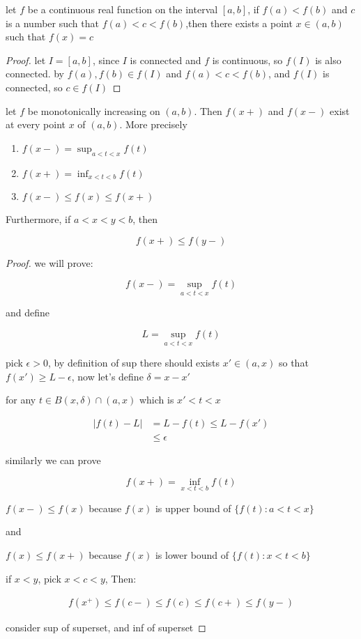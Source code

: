 \begin{corollary}
    let $f$ be a continuous real function on the interval $[a,b]$, if $f(a) < f(b)$ and $c$
    is a number such that $f(a) < c < f(b)$,then there exists a point $x \in (a,b)$ such that 
    $f(x) = c$
\end{corollary}

\begin{proof}
    let $I = [a,b]$, since $I$ is connected and $f$ is continuous, so $f(I)$ is also connected.
    by $f(a), f(b) \in f(I)$ and $f(a) < c < f(b)$, and $f(I)$ is connected, 
    so $c \in f(I)$
\end{proof}

\begin{thm}
    let $f$ be monotonically increasing on $(a,b)$. Then $f(x+)$ and $f(x-)$ 
    exist at every point $x $ of $(a,b)$. More precisely

    \begin{enumerate}
        \item $f(x-) = \sup_{a < t <x}f(t)$
        \item $f(x+) = \inf_{x < t <b}f(t)$
        \item $f(x-) \le f(x) \le f(x+)$
    \end{enumerate}

    Furthermore, if $a < x < y < b$, then

    \[
        f(x+) \le f(y-)
    \]
\end{thm}

\begin{proof}
    we will prove:

    \[
        f(x-) = \sup_{a < t <x}f(t)
    \]

    and define

    \[
        L = \sup_{a < t <x}f(t)
    \]

    
    pick $\epsilon > 0$, by definition of sup there should 
    exists $x' \in (a,x)$ so that $f(x') \ge L - \epsilon$, now let's define $\delta = x -x'$

    for any $t \in B(x, \delta) \cap (a,x)$ which is $x' < t < x$

    \begin{align*}
        \left| f(t) - L \right| &= L - f(t) \le L - f(x') \\
        & \le \epsilon
    \end{align*}

    similarly we can prove 


    \[
        f(x+) = \inf_{x < t <b}f(t)
    \]

    $f(x-) \le f(x)$ because $f(x)$ is upper bound of $\{ f(t): a<t<x \}$

    and


    $f(x) \le f(x+)$ because $f(x)$ is lower bound of $\{ f(t): x<t<b \}$

    if $x < y$, pick $x < c < y$, Then:

    \begin{align}
        f(x^+) \le f(c-) \le f(c) \le f(c+) \le f(y-)
    \end{align}

    consider sup of superset, and inf of superset

\end{proof}